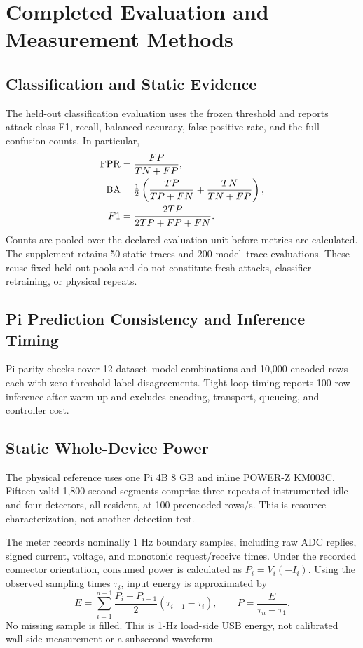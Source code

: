 \section{Completed Evaluation and Measurement Methods}
\subsection{Classification and Static Evidence}
The held-out classification evaluation uses the frozen threshold and reports attack-class F1, recall, balanced accuracy, false-positive rate, and the full confusion counts. In particular,
\begin{align}
 \operatorname{FPR} &= \frac{FP}{TN+FP},\\
 \operatorname{BA} &= \tfrac12\left(\frac{TP}{TP+FN}+\frac{TN}{TN+FP}\right),\\
 F1 &= \frac{2TP}{2TP+FP+FN}.
\end{align}
Counts are pooled over the declared evaluation unit before metrics are calculated. The supplement retains 50 static traces and 200 model--trace evaluations. These reuse fixed held-out pools and do not constitute fresh attacks, classifier retraining, or physical repeats.

\subsection{Pi Prediction Consistency and Inference Timing}
Pi parity checks cover 12 dataset--model combinations and 10,000 encoded rows each with zero threshold-label disagreements. Tight-loop timing reports 100-row inference after warm-up and excludes encoding, transport, queueing, and controller cost.

\subsection{Static Whole-Device Power}
The physical reference uses one Pi 4B 8 GB and inline POWER-Z KM003C. Fifteen valid 1,800-second segments comprise three repeats of instrumented idle and four \ton{} detectors, all resident, at 100 preencoded rows/s. This is resource characterization, not another detection test.

The meter records nominally 1 Hz boundary samples, including raw ADC replies, signed current, voltage, and monotonic request/receive times. Under the recorded connector orientation, consumed power is calculated as $P_i=V_i(-I_i)$. Using the observed sampling times $\tau_i$, input energy is approximated by
\begin{equation}
 E=\sum_{i=1}^{n-1}\frac{P_i+P_{i+1}}{2}(\tau_{i+1}-\tau_i),
 \qquad \bar P=\frac{E}{\tau_n-\tau_1}.
\end{equation}
No missing sample is filled. This is 1-Hz load-side USB energy, not calibrated wall-side measurement or a subsecond waveform.

